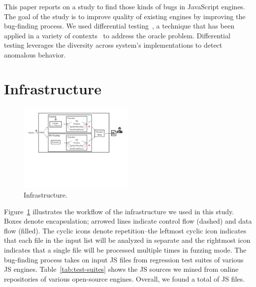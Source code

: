 \documentclass[10pt,conference,anonymous]{IEEEtran}
\begin{document}
This paper reports on a study to find those kinds of bugs in
JavaScript engines. The goal of the study is to improve
quality of existing \js{} engines by improving the bug-finding
process. We used differential testing~\cite{Brumley-etal-ss07}, a
technique that has been applied in a variety of
contexts~\cite{Yang-etal-pldi11,Chen-etal-fse2015,Argyros-etla-ccs16,Chen-etal-pldi16,petsios-etal-sp2017,SivakornAPKJ17}
to address the oracle problem. Differential testing leverages the
diversity across system's implementations to detect anomalous
behavior.  

\section{Infrastructure}
\label{sec:design}


\begin{figure}[t]
  \centering
  \includegraphics[trim=0 250 0 0,clip,width=0.5\textwidth]{google-awards-workflow}  
  \caption{\label{fig:workflow}Infrastructure.}
\end{figure}

Figure~\ref{fig:workflow} illustrates the workflow of the
infrastructure we used in this study. Boxes denote encapsulation;
arrowed lines indicate control flow (dashed) and data flow
(filled). The cyclic icons denote repetition--the leftmost cyclic icon
indicates that each file in the input list will be analyzed in
separate and the rightmost icon indicates that a single file will be
processed multiple times in fuzzing mode. The bug-finding process
takes on input JS files from regression test suites of various JS
engines. Table~\ref{tab:test-suites} shows the JS sources we mined
from online repositories of various open-source engines. Overall, we
found a total of  JS files.
\end{document}
